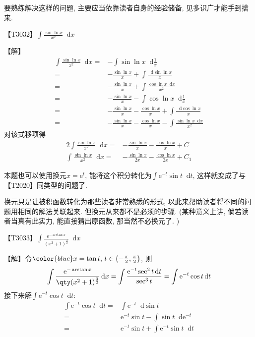 \documentclass{ctexbook}
\newcommand{\e}{\mathrm{e}}
\newcommand*{\dif}{\mathop{}\!\mathrm{d}}
\begin{document}
{{要熟练解决这样的问题, 主要应当依靠读者自身的经验储备, 见多识广才能手到擒来. \par}
{\color{red}【T3032】}$\int\frac{\sin{\ln{x}}}{x^{2}}\dif{x}$\par
【解】
\begin{align*}
\int\frac{\sin{\ln{x}}}{x^{2}}\dif{x}={}&-\int\sin{\ln{x}}\dif{\frac{1}{x}}\\
={}&-\frac{\sin{\ln{x}}}{x}+\int\frac{\dif{\sin{\ln{x}}}}{x}\\
={}&-\frac{\sin{\ln{x}}}{x}+\int\frac{\cos{\ln{x}}\dif{x}}{x^{2}}\\
={}&-\frac{\sin{\ln{x}}}{x}-\int\cos{\ln{x}}\dif{\frac{1}{x}}\\
={}&-\frac{\sin{\ln{x}}}{x}-\frac{\cos{\ln{x}}}{x}+\int\frac{\dif{\cos{\ln{x}}}}{x}\\
={}&-\frac{\sin{\ln{x}}}{x}-\frac{\cos{\ln{x}}}{x}-\int\frac{\sin{\ln{x}}\dif{x}}{x^{2}}
\end{align*}
对该式移项得
\begin{align*}
2\int\frac{\sin{\ln{x}}}{x^{2}}\dif{x}={}&-\frac{\sin{\ln{x}}}{x}-\frac{\cos{\ln{x}}}{x}+C\\
\int\frac{\sin{\ln{x}}}{x^{2}}\dif{x}={}&-\frac{\sin{\ln{x}}}{2x}-\frac{\cos{\ln{x}}}{2x}+C_{1}
\end{align*}\par
{\kaishu 本题也可以使用换元$x=\e^{t}$, 能将这个积分转化为$\int\e^{-t}\sin{t}\dif{t}$, 这样就变成了与{\color{red}【T2020】}同类型的问题了. \par
换元只是让被积函数转化为那些读者非常熟悉的形式, 以此来帮助读者将不同的问题用相同的解法关联起来. 但换元从来都不是必须的步骤.  (某种意义上讲, 倘若读者当真有此实力, 能直接猜出原函数, 那当然不必换元了. ) \par}
{\color{red}【T3033】}$\int\frac{\e^{-\arctan{x}}}{\left(x^{2}+1\right)^{\frac{3}{2}}}\dif{x}$\par
【解】令$\color{blue}x=\tan{t},\,t\in\left(-\frac{\pi}{2},\frac{\pi}{2}\right)$, 则
\begin{align*}
\int\frac{\e^{-\arctan{x}}}{\qty(x^{2}+1)^{\frac{3}{2}}}\dif{x}=\int\frac{\e^{-t}\sec^{2}{t}\dif{t}}{\sec^{3}{t}}=\int\e^{-t}\cos{t}\dif{t}
\end{align*}
接下来解$\int\e^{-t}\cos{t}\dif{t}$: 
\begin{align*}
\int\e^{-t}\cos{t}\dif{t}={}&\int\e^{-t}\dif{\sin{t}}\\
={}&\e^{-t}\sin{t}-\int\sin{t}\dif{\e^{-t}}\\
={}&\e^{-t}\sin{t}+\int\e^{-t}\sin{t}\dif{t}\\

\end{align*}}
\end{document}
